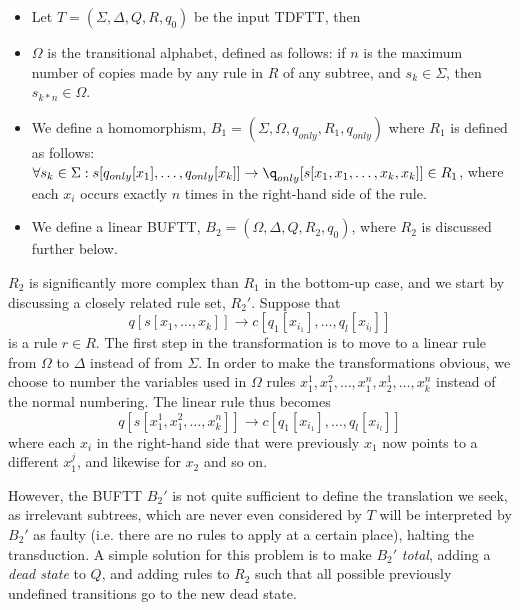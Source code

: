 \begin{itemize}
\item Let $T = (\Sigma, \Delta, Q, R, q_0)$ be the input TDFTT, then

\item $\Omega$ is the transitional alphabet, defined as follows: if $n$ is
the maximum number of copies made by any rule in $R$ of any subtree, and 
$s_k \in \Sigma$, then $s_{k*n} \in \Omega$.

\item We define a homomorphism, $B_1 = (\Sigma, \Omega, q_{only}, R_1, q_{only})$
where $R_1$ is defined as follows: $\forall s_k \in \Sigma:
s[q_{only}[x_1],\ldots,q_{only}[x_k]] \rightarrow
\q_{only}[s[x_1,x_1,\ldots,x_k,x_k]] \in R_1$, where each $x_i$ occurs
exactly $n$ times in the right-hand side of the rule.

\item We define a linear BUFTT, $B_2 = (\Omega, \Delta, Q, R_2, q_0)$,
	where $R_2$ is discussed further below.
\end{itemize}

$R_2$ is significantly more complex than $R_1$ in the bottom-up case, and we
start by discussing a closely related rule set, $R_2'$. Suppose
that $$q[s[x_1,\ldots,x_k]] \rightarrow c[q_1[x_i_1],\ldots,q_l[x_i_l]]$$
is a rule $r \in R$. The first step in the transformation is to move to a
linear rule from $\Omega$ to $\Delta$ instead of from $\Sigma$.  In order
to make the transformations obvious, we choose to number the variables used
in $\Omega$ rules $x_1^1,x_1^2,\ldots,x_1^n,x_2^1,\ldots,x_k^n$ instead of
the normal numbering. The linear rule thus becomes
$$q[s[x_1^1,x_1^2,\ldots,x_k^n]] \rightarrow c[q_1[x_i_1],\ldots,q_l[x_i_l]]$$
where each $x_i$ in the right-hand side that were previously $x_1$ now
points to a different $x_1^j$, and likewise for $x_2$ and so on.





However, the BUFTT $B_2'$ is not quite sufficient to define the translation
we seek, as irrelevant subtrees, which are never even considered by $T$
will be interpreted by $B_2'$ as faulty (i.e. there are no rules to apply
at a certain place), halting the transduction. A simple solution for this
problem is to make $B_2'$ \emph{total}, adding a \emph{dead state} to $Q$,
and adding rules to $R_2$ such that all possible previously undefined
transitions go to the new dead state.


